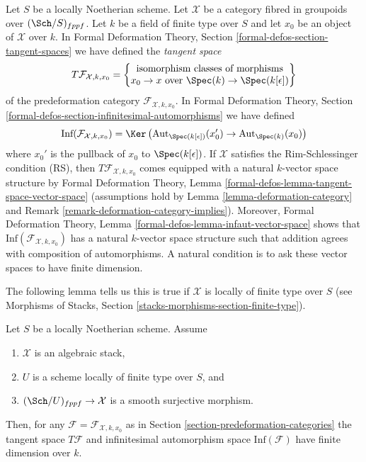 \noindent
Let $S$ be a locally Noetherian scheme. Let $\mathcal{X}$ be a category
fibred in groupoids over $(\Sch/S)_{fppf}$. Let $k$ be a field of finite
type over $S$ and let $x_0$ be an object of $\mathcal{X}$ over $k$.
In Formal Deformation Theory, Section \ref{formal-defos-section-tangent-spaces}
we have defined the {\it tangent space}
\begin{equation}
\label{equation-tangent-space}
T\mathcal{F}_{\mathcal{X}, k, x_0} =
\left\{
\begin{matrix}
\text{isomorphism classes of morphisms}\\
x_0 \to x\text{ over }\Spec(k) \to \Spec(k[\epsilon])
\end{matrix}
\right\}
\end{equation}
of the predeformation category $\mathcal{F}_{\mathcal{X}, k, x_0}$.
In Formal Deformation Theory, Section
\ref{formal-defos-section-infinitesimal-automorphisms}
we have defined
\begin{equation}
\label{equation-infinitesimal-automorphisms}
\text{Inf}(\mathcal{F}_{\mathcal{X}, k, x_0}) =
\Ker\left(
\text{Aut}_{\Spec(k[\epsilon])}(x'_0) \to \text{Aut}_{\Spec(k)}(x_0)
\right)
\end{equation}
where $x_0'$ is the pullback of $x_0$ to $\Spec(k[\epsilon])$.
If $\mathcal{X}$ satisfies the Rim-Schlessinger condition (RS), then
$T\mathcal{F}_{\mathcal{X}, k, x_0}$ comes equipped with a natural
$k$-vector space structure by Formal Deformation Theory, Lemma
\ref{formal-defos-lemma-tangent-space-vector-space}
(assumptions hold by Lemma \ref{lemma-deformation-category} and
Remark \ref{remark-deformation-category-implies}). Moreover,
Formal Deformation Theory, Lemma \ref{formal-defos-lemma-infaut-vector-space}
shows that $\text{Inf}(\mathcal{F}_{\mathcal{X}, k, x_0})$ has a
natural $k$-vector space structure such that addition agrees with
composition of automorphisms. A natural condition
is to ask these vector spaces to have finite dimension.

\medskip\noindent
The following lemma tells us this is true if
$\mathcal{X}$ is locally of finite type over $S$ (see
Morphisms of Stacks, Section \ref{stacks-morphisms-section-finite-type}).

\begin{lemma}
\label{lemma-finite-dimension}
Let $S$ be a locally Noetherian scheme. Assume
\begin{enumerate}
\item $\mathcal{X}$ is an algebraic stack,
\item $U$ is a scheme locally of finite type over $S$, and
\item $(\Sch/U)_{fppf} \to \mathcal{X}$ is a smooth surjective
morphism.
\end{enumerate}
Then, for any $\mathcal{F} = \mathcal{F}_{\mathcal{X}, k, x_0}$ as in
Section \ref{section-predeformation-categories}
the tangent space $T\mathcal{F}$ and infinitesimal automorphism space
$\text{Inf}(\mathcal{F})$ have finite dimension over $k$.
\end{lemma}

